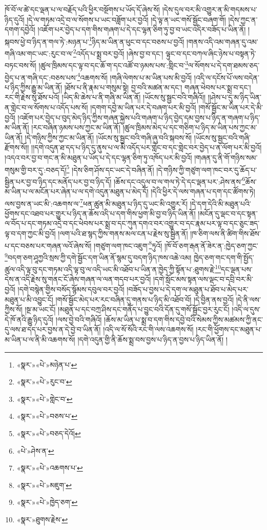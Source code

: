 ཁོ་བོ་ལ་ཚེ་དང་ལྡན་པ་ལ་བརྗོད་པའི་ཕྱིར་བསྔོགས་པ་ཡོད་དོ་ཞེས་སོ། །དེས་དུལ་བར་མི་འགྱུར་ན་མི་གདམས་པ་ཉིད་དུའོ། །དེ་ལ་གཏམ་འདྲེ་བ་ལ་སོགས་པ་ཡང་བཟློག་པར་བྱའོ། །དེ་ལྟ་ན་ཡང་གསོ་སྦྱོང་བཞག་གོ། །དེས་ཀྱང་ན་དགག་དབྱེའོ། །འཇོག་པར་བྱེད་པ་དག་གིས་གཞག་པ་དེ་དང་ལྷན་ཅིག་ཏུ་བྱ་བ་ཡང་འདིར་བཟོད་པ་ཡིན་ནོ། །སྐབས་ཕྱེ་བ་ཉིད་ན་གལ་ཏེ་:མཉན་པ་\footnote{«སྣར་»«པེ་»མཉེན་པ་}ཉིད་མ་ཡིན་ན་ཕུང་བ་དང་བཅས་པ་བྱའོ། །གནས་འདི་འམ་གཞན་དུ་འམ་གཞི་འམ་གང་ཡང་:རུང་བ་ལ་\footnote{«སྣར་»«པེ་»རུང་བ་}འདོད་པ་སྨྲ་བར་བྱའོ། །ཞེས་བྱ་བ་དང་། ལྟུང་བ་དང་བཀལ་ཞིང་ཉེས་པ་བསྟན་ཏེ་བཏང་བས་སོ། །ཚུལ་ཁྲིམས་དང་ལྟ་བ་དང་ཆོ་ག་དང་འཚོ་བ་ཉམས་པས་:གླིང་བ་\footnote{«སྣར་»«པེ་»གླེང་བ་}ལ་སོགས་པ་དེ་དག་ཐམས་ཅད་བྱེད་པ་ན་གཞི་དང་:བཅས་པས་\footnote{«སྣར་»«པེ་»བཅས་པ་}འཆགས་སོ། །གཞི་ལེགས་པ་མ་ཡིན་པས་མི་བྱའོ། །འདི་ལ་དངོས་པོ་ལས་བདེན་པ་ཉིད་ཀྱིས་རྒྱུ་མ་ཡིན་ནོ། །ཐོས་པ་ནི་རྣམ་པ་གསུམ་སྟེ། བྱ་བའི་མཚན་མ་དང་། གཞན་ཕེབས་པར་སྨྲ་བ་དང་། རང་གི་རྗེས་སུ་ཐོས་པའོ། །ཡིད་མི་ཆེས་པ་ནི་གཞི་མ་ཡིན་ནོ། །ཡོངས་སུ་སྦྱང་བའི་གཞིའོ།། །།ཤེས་པ་དུ་མ་ཉིད་ཡིན་ན་གླེང་བ་ལ་སོགས་པ་འདོད་པས་སོ། །དགག་དབྱེ་མ་ཡིན་པར་དེ་བཞག་པར་མི་བྱའོ། །གསོ་སྦྱོང་མ་ཡིན་པར་དེ་མི་བྱའོ། །འཇོག་པར་བྱེད་པ་བུད་མེད་ཉིད་ཀྱིས་གཞན་སྐྱེས་པའི་གཞག་པ་ཉིད་བྱེད་དམ་བྱས་པ་ཉིད་ན་གཞག་པ་ཉིད་མ་ཡིན་ནོ། །རང་བཞིན་ཉམས་པས་ཀྱང་མ་ཡིན་ནོ། །ཚུལ་ཁྲིམས་མེད་པ་དང་གཅིག་པ་ཉིད་མ་ཡིན་པས་ཀྱང་མ་ཡིན་ནོ། །དེ་གཉིས་ཀྱིས་ཀྱང་མ་ཡིན་ནོ། །ཡོངས་སུ་སྦྱང་བའི་གཞི་ཞུ་བའི་སྐབས་སོ། །ཡོངས་སུ་སྦྱང་བའི་གཞི་རྫོགས་སོ།། །།དགེ་འདུན་ཐ་དད་པ་ཉིད་དུ་ནུས་པ་ལ་མི་འདོད་པར་གླེང་བ་དང་གླེང་བར་བྱེད་པ་ན་ལོག་པར་མི་བྱའོ། །འདའ་བར་བྱ་བ་གང་ན་མི་མཐུན་པ་ཡོད་པ་དེ་དང་ལྷན་ཅིག་ཏུ་འཁོད་པར་མི་བྱའོ། །གཞན་དུ་ནི་གོ་གཉིས་སམ་གསུམ་གྱི་བར་དུ་:བཅད་དོ།\footnote{«སྣར་»«པེ་»བཅད་དེའོ།} །དེས་ཅིག་ཤོས་དང་ཡང་དེ་བཞིན་ནོ། །དེ་གཉིས་ཀྱི་གཙུག་ལག་ཁང་བར་དུ་ཆོད་པ་སྦྱིན་པར་བྱ་བ་ཉིད་དང་མནོད་པར་བྱ་བ་ཉིད་དོ། །ཆོས་དང་འདུལ་བ་ལ་གལ་ཏེ་དེ་དང་ལྡན་པར་:ཤེས་ནས་\footnote{«པེ་»ཤེས་ན་}ཆོས་མ་ཡིན་པ་ལ་མངོན་པར་ཞེན་པ་ལ་དགེ་འདུན་མཐུན་པ་མེད་དོ། །དེའི་ཕྱིར་དེ་ལས་གཞན་པ་དག་དང་ཚོགས་ཏེ། ལས་བྱས་ན་ཡང་མི་:འཆགས་ལ་\footnote{«སྣར་»«པེ་»འཆགས་པ་}ཕན་ཚུན་མི་མཐུན་པ་ཉིད་དུ་ཡང་མི་འགྱུར་རོ། །དེ་དག་དེའི་མི་མཐུན་པའི་ཕྱོགས་དང་འཐབ་པར་གྱུར་པ་ཉིད་ན་ཆོས་འདི་པ་དག་གིས་ཕྱག་མི་བྱ་བ་ཉིད་ཡིན་ནོ། །མངོན་དུ་ལྡང་བ་དང་སྟན་ལ་བོད་པ་དང་གཏམ་འདྲེ་བ་དང་ཕེབས་པར་སྨྲ་བ་དང་ཀུན་དགའ་བར་འགྱུར་བ་དང་རྣམ་པར་ལྟ་བ་དང་ཅུང་ཟད་ལྟ་བ་དག་ཀྱང་མི་བྱའོ། །ལག་པའི་ཐ་སྙད་ཀྱིས་གནས་མལ་ངན་པ་རྗེས་སུ་སྦྱིན་ནོ། །ཁ་ཅིག་ལས་ནི་ཚིག་གིས་ཐོས་པ་དང་བཅས་པར་གཞན་ལའོ་ཞེས་སོ། །གཙུག་ལག་ཁང་འཇུག་\footnote{«སྣར་»«པེ་»མཇུག་}ཏུའོ། །ཁོ་བོ་ཅག་རྒན་ནོ་ཟེར་ན་:ཁྱེད་ཅག་ཀྱང་\footnote{«སྣར་»«པེ་»ཁྱེད་ཅག་}བདག་ཅག་ཤཱཀྱའི་སྲས་ཀྱི་དགེ་སྦྱོང་དག་ཡིན་ནོ་སྙམ་དུ་བདག་ཉིད་ཁས་འཆེ་འམ། ཁྱེད་ཅག་གང་དག་གི་སྤྱོད་ཚུལ་འདི་ལྟ་བུ་དང་གཏམ་འདི་ལྟ་བུ་ལ་འདི་ཡང་མི་འཐོབ་པ་ཡིན་ན་ཁྱེད་ཀྱི་སྟོན་པ་:ཐུགས་རྗེ་\footnote{«སྣར་»ཐུགས་རྗེས་}དང་ལྡན་པས་དེས་ན་འདི་རྗེས་སུ་གནང་ངོ་ཞེས་གཞན་ལ་ལན་གདབ་པར་བྱའོ། །དགེ་སློང་མས་སྟན་ལས་ལྡང་བ་དབྲི་བར་མི་བྱའོ། །དགེ་བསྙེན་གྱིས་བསོད་སྙོམས་དབུལ་བར་བྱའོ། །བཟོད་པ་བྱས་པ་དེ་དག་ལ་མཐུན་པ་ཐོབ་པ་མེད་པར་མཐུན་པ་མི་འབྱུང་ངོ། །གསོ་སྦྱོང་མེད་པར་རང་བཞིན་དུ་གནས་པ་ཉིད་མི་འཐོབ་བོ། །དེ་བྱིན་ནས་བྱའོ། །དེ་ནི་ལས་ཀྱིས་སོ། །སྔ་མ་ཡང་ངོ། །མཐུན་པ་དང་བཀྲ་ཤིས་དང་གནོད་པ་བྱུང་བའི་དོན་དུ་གསོ་སྦྱོང་བྱར་རུང་ངོ། །འདི་ལ་དུས་དེ་ཁོ་ནའི་རྒྱུ་ཉིད་དུའོ། །ལས་བྱེ་བའི་གཞིའོ། །ཆོས་མ་ཡིན་པ་སྨྲ་བ་དག་གིས་དབྱེ་བའི་སེམས་ཀྱིས་མཚམས་ཀྱི་ནང་དུ་ལས་ཐ་དད་པར་བྱས་ན་དེ་བྱེ་བ་ཡིན་ནོ། །འདི་ལ་སོ་སོའི་རང་གི་ལས་འཆགས་སོ། །རང་གི་ཕྱོགས་དང་མཐུན་པ་མ་ཡིན་པ་ལ་ནི་མི་འཆགས་སོ། །དགེ་འདུན་གྱི་ནི་ཆོས་སྨྲ་བས་བྱས་པ་ཉིད་ན་བྱས་པ་ཉིད་ཡིན་ནོ། །
